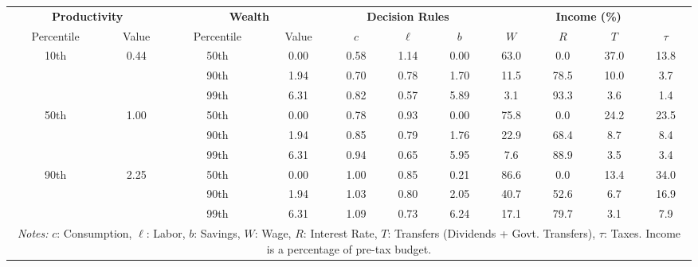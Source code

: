 \begin{tabular}{ccccccccccc}
    \toprule
    \multicolumn{2}{c}{\textbf{Productivity}} & \multicolumn{2}{c}{\textbf{Wealth}} & \multicolumn{3}{c}{\textbf{Decision Rules}} & \multicolumn{4}{c}{\textbf{Income (\%)}} \\
    \cmidrule(lr){1-2} \cmidrule(lr){3-4} \cmidrule(lr){5-7} \cmidrule(lr){8-11}
    Percentile & Value & Percentile & Value & $c$ & $\ell$ & $b$ & $W$ & $R$ & $T$ & $\tau$ \\
    \midrule
    \multicolumn{1}{c}{\multirow{3}{*}{10th}} & \multicolumn{1}{c}{\multirow{3}{*}{0.44}}
     & 50th & 0.00 & 0.58 & 1.14 & 0.00 & 63.0 & 0.0 & 37.0 & 13.8 \\
    && 90th & 1.94 & 0.70 & 0.78 & 1.70 & 11.5 & 78.5 & 10.0 & 3.7 \\
    && 99th & 6.31 & 0.82 & 0.57 & 5.89 & 3.1 & 93.3 & 3.6 & 1.4 \\
    \cmidrule(lr){1-2}
    \multicolumn{1}{c}{\multirow{3}{*}{50th}} & \multicolumn{1}{c}{\multirow{3}{*}{1.00}}
     & 50th & 0.00 & 0.78 & 0.93 & 0.00 & 75.8 & 0.0 & 24.2 & 23.5 \\
    && 90th & 1.94 & 0.85 & 0.79 & 1.76 & 22.9 & 68.4 & 8.7 & 8.4 \\
    && 99th & 6.31 & 0.94 & 0.65 & 5.95 & 7.6 & 88.9 & 3.5 & 3.4 \\
    \cmidrule(lr){1-2}
    \multicolumn{1}{c}{\multirow{3}{*}{90th}} & \multicolumn{1}{c}{\multirow{3}{*}{2.25}}
     & 50th & 0.00 & 1.00 & 0.85 & 0.21 & 86.6 & 0.0 & 13.4 & 34.0 \\
    && 90th & 1.94 & 1.03 & 0.80 & 2.05 & 40.7 & 52.6 & 6.7 & 16.9 \\
    && 99th & 6.31 & 1.09 & 0.73 & 6.24 & 17.1 & 79.7 & 3.1 & 7.9 \\
    \bottomrule
    \multicolumn{11}{c}{\parbox{6in}{\vspace{1ex} \scriptsize \textit{Notes:} $c$: Consumption, $\ell$: Labor, $b$: Savings, $W$: Wage, $R$: Interest Rate, $T$: Transfers (Dividends + Govt. Transfers), $\tau$: Taxes. Income is a percentage of pre-tax budget.}}
\end{tabular}
\vspace{1ex}
